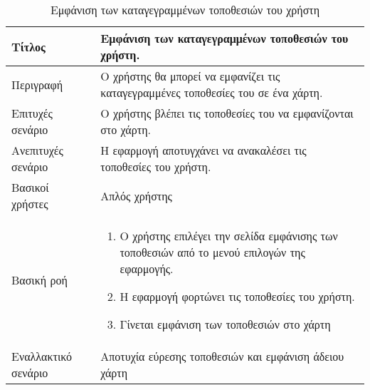 \begin{table}[h]
 \caption{Εμφάνιση των καταγεγραμμένων τοποθεσιών του χρήστη}
\begin{center}
\begin{tabular}{ | m{10em} |  m{25em} | } 
\hline
 Τίτλος & Εμφάνιση των καταγεγραμμένων τοποθεσιών του χρήστη. \\ 
\hline
 Περιγραφή & Ο χρήστης θα μπορεί να εμφανίζει τις καταγεγραμμένες τοποθεσίες του σε ένα χάρτη. \\ 
\hline
 Επιτυχές σενάριο & Ο χρήστης βλέπει τις τοποθεσίες του να εμφανίζονται στο χάρτη.\\
\hline
 Ανεπιτυχές σενάριο  & Η εφαρμογή αποτυγχάνει να ανακαλέσει τις τοποθεσίες του χρήστη. \\ 
\hline
 Βασικοί χρήστες  & Απλός χρήστης \\ 
\hline
 Βασική ροή  & 
\begin{enumerate}
\item Ο χρήστης επιλέγει την σελίδα εμφάνισης των τοποθεσιών από το μενού επιλογών της εφαρμογής.
\item Η εφαρμογή φορτώνει τις τοποθεσίες του χρήστη.
\item Γίνεται εμφάνιση των τοποθεσιών στο χάρτη
\end{enumerate}
 \\ 
\hline
 Εναλλακτικό σενάριο  & Αποτυχία εύρεσης τοποθεσιών και εμφάνιση άδειου χάρτη \\ 
\hline
\end{tabular}
\end{center}
\end{table}



